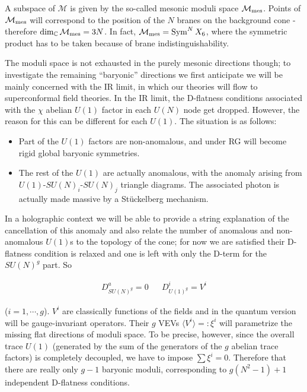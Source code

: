 A subspace of $\mathcal{M}$ is given by the so-called mesonic moduli space $\mathcal{M}_\mathrm{mes}$. Points of $\mathcal{M}_\mathrm{mes}$ will correspond to the position of the $N$ branes on the background cone - therefore $\dim_\mathbb{C} \mathcal{M}_\mathrm{mes} = 3N$. In fact, $\mathcal{M}_\mathrm{mes} = \operatorname{Sym}^N X_6$, where the symmetric product has to be taken because of brane indistinguishability.

The moduli space is not exhausted in the purely mesonic directions though; to investigate the remaining ``baryonic'' directions we first anticipate we will be mainly concerned with the IR limit, in which our theories will flow to superconformal field theories. In the IR limit, the D-flatness conditions associated with the $\chi$ abelian $U(1)$ factor in each $U(N)$ node get dropped. However, the reason for this can be different for each $U(1)$. The situation is as follows:

\begin{itemize}
	\item Part of the $U(1)$ factors are non-anomalous, and under RG will become rigid global baryonic symmetries.
	\item The rest of the $U(1)$ are actually anomalous, with the anomaly arising from $U(1)$-$SU(N)_i$-$SU(N)_j$ triangle diagrams. The associated photon is actually made massive by a St\"uckelberg mechanism\cite{Martelli:sbv}.
\end{itemize}

In a holographic context we will be able to provide a string explanation of the cancellation of this anomaly and also relate the number of anomalous and non-anomalous $U(1)$s to the topology of the cone; for now we are satisfied their D-flatness condition is relaxed and one is left with only the D-term for the $SU(N)^g$ part. So

\begin{align}
	D^a_{SU(N)^g} = 0 && D^i_{U(1)^g} = V^i
	\label{}
\end{align}

($i=1,\cdots,g$). $V^i$ are classically functions of the fields and in the quantum version will be gauge-invariant operators. Their $g$ VEVs $\langle V^i \rangle =: \xi^i$ will parametrize the missing flat directions of moduli space. To be precise, however, since the overall trace $U(1)$ (generated by the sum of the generators of the $g$ abelian trace factors) is completely decoupled, we have to impose $\sum \xi^i = 0$. Therefore that there are really only $g-1$ baryonic moduli, corresponding to $g(N^2-1)+1$ independent D-flatness conditions.

